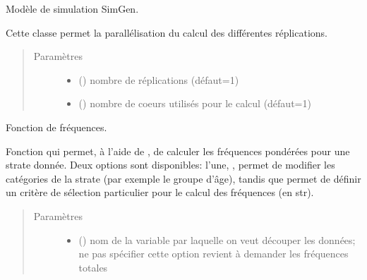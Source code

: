 \documentclass[letterpaper,10pt,french]{sphinxmanual}
\begin{document}
\begin{fulllineitems}
\label{\detokenize{utilisation:id7}}
Modèle de simulation SimGen.

Cette classe permet la parallélisation du calcul des différentes réplications.
\begin{quote}\begin{description}
\item[{Paramètres}] \leavevmode\begin{itemize}
\item {} 
 () \textendash{} nombre de réplications (défaut=1)

\item {} 
 () \textendash{} nombre de coeurs utilisés pour le calcul (défaut=1)

\end{itemize}

\end{description}\end{quote}

\begin{fulllineitems}
\label{\detokenize{utilisation:simgen.replicate.freq}}
Fonction de fréquences.

Fonction qui permet, à l’aide de , de calculer les fréquences pondérées pour une strate donnée. Deux options sont disponibles: l’une, , permet de modifier les catégories de la strate (par exemple le groupe d’âge), tandis que  permet de définir un critère de sélection particulier pour le calcul des fréquences (en str).
\begin{quote}\begin{description}
\item[{Paramètres}] \leavevmode\begin{itemize}
\item {} 
 () \textendash{} nom de la variable par laquelle on veut découper les données; ne pas spécifier cette option revient à demander les fréquences totales


\end{itemize}
\end{description}
\end{quote}
\end{fulllineitems}
\end{fulllineitems}
\end{document}
